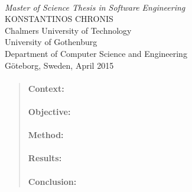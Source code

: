 \begin{titlepage}

\mbox{}
\vfill
\addtolength{\voffset}{2cm}
\begin{flushleft}
	{ \\[0.5cm]
\emph{\Large Master of Science Thesis in Software Engineering} \\[.8cm]
	
	{\huge KONSTANTINOS CHRONIS}\\[.8cm]
	
	{\Large Chalmers University of Technology \\
    University of Gothenburg} \\
     Department of Computer Science and Engineering \\
     Göteborg, Sweden,  April 2015
  } 
	
\end{flushleft}

\end{titlepage}
\ClearShipoutPicture

\pagestyle{empty}
\newpage
\clearpage
\mbox{}
\newpage
\clearpage
\thispagestyle{empty}

\begin{abstract}
\paragraph{Context:} 

\paragraph{Objective:} 
 
\paragraph{Method:} 

\paragraph{Results:} 

\paragraph{Conclusion:} 
\end{abstract}

